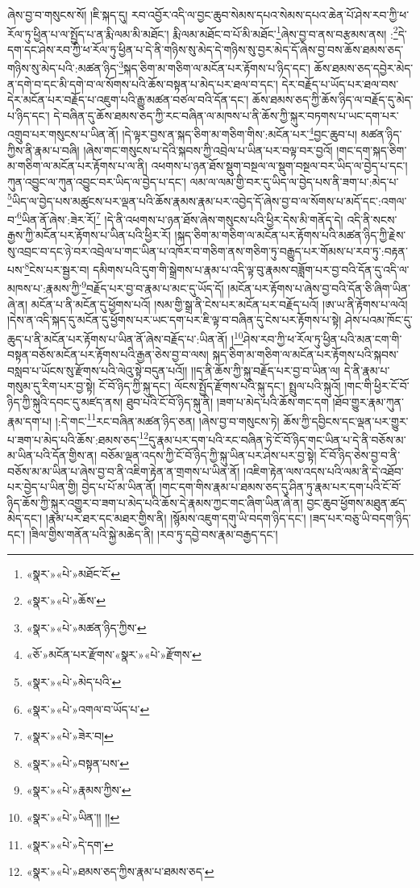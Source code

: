 ཞེས་བྱ་བ་གསུངས་སོ། །ཇི་སྐད་དུ། རབ་འབྱོར་འདི་ལ་བྱང་ཆུབ་སེམས་དཔའ་སེམས་དཔའ་ཆེན་པོ་ཤེས་རབ་ཀྱི་ཕ་རོལ་ཏུ་ཕྱིན་པ་ལ་སྤྱོད་པ་ན་རྨི་ལམ་མི་མཐོང་། རྨི་ལམ་མཐོང་བ་པོ་མི་མཐོང་\footnote{«སྣར་»«པེ་»མཐོང་ངོ་}ཞེས་བྱ་བ་ནས་བརྩམས་ནས། :\footnote{«སྣར་»«པེ་»ཆོས་}དེ་དག་དང་ཤེས་རབ་ཀྱི་ཕ་རོལ་ཏུ་ཕྱིན་པ་དེ་ནི་གཉིས་སུ་མེད་དེ་གཉིས་སུ་བྱར་མེད་དོ་ཞེས་བྱ་བས་ཆོས་ཐམས་ཅད་གཉིས་སུ་མེད་པའི་:མཚན་ཉིད་\footnote{«སྣར་»«པེ་»མཚན་ཉིད་ཀྱིས་}སྐད་ཅིག་མ་གཅིག་ལ་མངོན་པར་རྟོགས་པ་ཉིད་དང་། ཆོས་ཐམས་ཅད་དབྱེར་མེད་ན་དགེ་བ་དང་མི་དགེ་བ་ལ་སོགས་པའི་ཆོས་བསྟན་པ་མེད་པར་ཐལ་བ་དང་། དེར་བརྗོད་པ་ཡོད་པར་ཐལ་བས་དེར་མངོན་པར་བརྗོད་པ་འཇུག་པའི་རྒྱུ་མཚན་བཙལ་བའི་དོན་དང་། ཆོས་ཐམས་ཅད་ཀྱི་ཆོས་ཉིད་ལ་བརྗོད་དུ་མེད་པ་ཉིད་དང་། དེ་བཞིན་དུ་ཆོས་ཐམས་ཅད་ཀྱི་རང་བཞིན་ལ་མཁས་པ་ནི་ཆོས་ཀྱི་སྐུར་བཏགས་པ་ཡང་དག་པར་འགྲུབ་པར་གསུངས་པ་ཡིན་ནོ། །དེ་ལྟར་བྱས་ན་སྐད་ཅིག་མ་གཅིག་གིས་:མངོན་པར་\footnote{«ཅོ་»མངོན་པར་རྫོགས་«སྣར་»«པེ་»རྫོགས་}བྱང་ཆུབ་པ། མཚན་ཉིད་ཀྱིས་ནི་རྣམ་པ་བཞི། །ཞེས་གང་གསུངས་པ་དེའི་སྐབས་ཀྱི་འབྲེལ་པ་ཡིན་པར་བལྟ་བར་བྱའོ། །གང་དག་སྐད་ཅིག་མ་གཅིག་ལ་མངོན་པར་རྟོགས་པ་ལ་ནི། འཕགས་པ་ཉན་ཐོས་སྡུག་བསྔལ་ལ་སྡུག་བསྔལ་བར་ཡིད་ལ་བྱེད་པ་དང་། ཀུན་འབྱུང་ལ་ཀུན་འབྱུང་བར་ཡིད་ལ་བྱེད་པ་དང་། ལམ་ལ་ལམ་གྱི་བར་དུ་ཡིད་ལ་བྱེད་པས་ནི་ཟག་པ་:མེད་པ་\footnote{«སྣར་»«པེ་»མེད་པའི་}ཡིད་ལ་བྱེད་པས་མཚུངས་པར་ལྡན་པའི་ཆོས་རྣམས་རྣམ་པར་འབྱེད་དོ་ཞེས་བྱ་བ་ལ་སོགས་པ་མདོ་དང་:འགལ་བ་\footnote{«སྣར་»«པེ་»འགལ་བ་ཡོད་པ་}ཡིན་ནོ་ཞེས་:ཟེར་རོ།\footnote{«སྣར་»«པེ་»ཟེར་བ།} །དེ་ནི་འཕགས་པ་ཉན་ཐོས་ཞེས་གསུངས་པའི་ཕྱིར་དེས་མི་གནོད་དེ། འདི་ནི་སངས་རྒྱས་ཀྱི་མངོན་པར་རྟོགས་པ་ཡིན་པའི་ཕྱིར་རོ། །སྐད་ཅིག་མ་གཅིག་ལ་མངོན་པར་རྟོགས་པའི་མཚན་ཉིད་ཀྱི་རྗེས་སུ་འབྲང་བ་དང་ཉེ་བར་འབྲེལ་པ་གང་ཡིན་པ་འཁོར་བ་གཅིག་ནས་གཅིག་ཏུ་བརྒྱུད་པར་གོམས་པ་རབ་ཏུ་:བརྟན་པས་\footnote{«སྣར་»«པེ་»བསྟན་པས་}ངེས་པར་སྦྱར་བ། དམིགས་པའི་དུག་གི་སྒྲེགས་པ་རྣམ་པ་འདི་ལྟ་བུ་རྣམས་བཟློག་པར་བྱ་བའི་དོན་དུ་འདི་ལ་མཁས་པ་:རྣམས་ཀྱི་\footnote{«སྣར་»«པེ་»རྣམས་ཀྱིས་}བརྗོད་པར་བྱ་བ་རྣམ་པ་མང་དུ་ཡོད་དོ། །མངོན་པར་རྟོགས་པ་ཞེས་བྱ་བའི་དོན་ཅི་ཞིག་ཡིན་ཞེ་ན། མངོན་པ་ནི་མངོན་དུ་ཕྱོགས་པའོ། །སམ་གྱི་སྒྲ་ནི་ངེས་པར་མངོན་པར་བརྗོད་པའོ། །ཨ་ཡ་ནི་རྟོགས་པ་ལའོ། །དེས་ན་འདི་སྐད་དུ་མངོན་དུ་ཕྱོགས་པར་ཡང་དག་པར་ཇི་ལྟ་བ་བཞིན་དུ་ངེས་པར་རྟོགས་པ་སྟེ། ཤེས་པའམ་ཁོང་དུ་ཆུད་པ་ནི་མངོན་པར་རྟོགས་པ་ཡིན་ནོ་ཞེས་བརྗོད་པ་:ཡིན་ནོ། །\footnote{«སྣར་»«པེ་»ཡིན་།། །།}ཤེས་རབ་ཀྱི་ཕ་རོལ་ཏུ་ཕྱིན་པའི་མན་ངག་གི་བསྟན་བཅོས་མངོན་པར་རྟོགས་པའི་རྒྱན་ཅེས་བྱ་བ་ལས། སྐད་ཅིག་མ་གཅིག་ལ་མངོན་པར་རྟོགས་པའི་སྐབས་བསླབ་པ་ཡོངས་སུ་རྫོགས་པའི་ལེའུ་སྟེ་བདུན་པའོ།། །།ད་ནི་ཆོས་ཀྱི་སྐུ་བརྗོད་པར་བྱ་བ་ཡིན་ལ། དེ་ནི་རྣམ་པ་གསུམ་དུ་རིག་པར་བྱ་སྟེ། ངོ་བོ་ཉིད་ཀྱི་སྐུ་དང་། ལོངས་སྤྱོད་རྫོགས་པའི་སྐུ་དང་། སྤྲུལ་པའི་སྐུའོ། །གང་གི་ཕྱིར་ངོ་བོ་ཉིད་ཀྱི་སྐུའི་དབང་དུ་མཛད་ནས། ཐུབ་པའི་ངོ་བོ་ཉིད་སྐུ་ནི། །ཟག་པ་མེད་པའི་ཆོས་གང་དག །ཐོབ་གྱུར་རྣམ་ཀུན་རྣམ་དག་པ། །:དེ་གང་\footnote{«སྣར་»«པེ་»དེ་དག་}རང་བཞིན་མཚན་ཉིད་ཅན། །ཞེས་བྱ་བ་གསུངས་ཏེ། ཆོས་ཀྱི་དབྱིངས་དང་ལྡན་པར་གྱུར་པ་ཟག་པ་མེད་པའི་ཆོས་:ཐམས་ཅད་\footnote{«སྣར་»«པེ་»ཐམས་ཅད་ཀྱིས་རྣམ་པ་ཐམས་ཅད་}དུ་རྣམ་པར་དག་པའི་རང་བཞིན་ཏེ་ངོ་བོ་ཉིད་གང་ཡིན་པ་དེ་ནི་བཅོས་མ་མ་ཡིན་པའི་དོན་གྱིས་ན། བཅོམ་ལྡན་འདས་ཀྱི་ངོ་བོ་ཉིད་ཀྱི་སྐུ་ཡིན་པར་ཤེས་པར་བྱ་སྟེ། ངོ་བོ་ཉིད་ཅེས་བྱ་བ་ནི་བཅོས་མ་མ་ཡིན་པ་ཞེས་བྱ་བ་ནི་འཇིག་རྟེན་ན་གྲགས་པ་ཡིན་ནོ། །འཇིག་རྟེན་ལས་འདས་པའི་ལམ་ནི་དེ་འཐོབ་པར་བྱེད་པ་ཡིན་གྱི། བྱེད་པ་པོ་མ་ཡིན་ནོ། །གང་དག་གིས་རྣམ་པ་ཐམས་ཅད་དུ་ཤིན་ཏུ་རྣམ་པར་དག་པའི་ངོ་བོ་ཉིད་ཆོས་ཀྱི་སྐུར་འགྱུར་བ་ཟག་པ་མེད་པའི་ཆོས་དེ་རྣམས་ཀྱང་གང་ཞིག་ཡིན་ཞེ་ན། བྱང་ཆུབ་ཕྱོགས་མཐུན་ཚད་མེད་དང་། །རྣམ་པར་ཐར་དང་མཐར་གྱིས་ནི། །སྙོམས་འཇུག་དགུ་ཡི་བདག་ཉིད་དང་། །ཟད་པར་བཅུ་ཡི་བདག་ཉིད་དང་། །ཟིལ་གྱིས་གནོན་པའི་སྐྱེ་མཆེད་ནི། །རབ་ཏུ་དབྱེ་བས་རྣམ་བརྒྱད་དང་། 